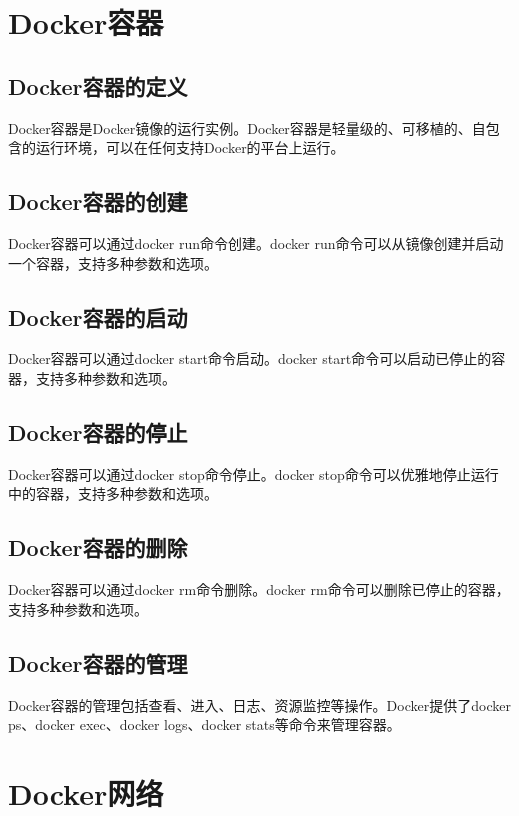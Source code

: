 \documentclass[12pt,UTF8]{ctexbook}
\begin{document}
\chapter{Docker容器}

\section{Docker容器的定义}

Docker容器是Docker镜像的运行实例。Docker容器是轻量级的、可移植的、自包含的运行环境，可以在任何支持Docker的平台上运行。

\section{Docker容器的创建}

Docker容器可以通过docker run命令创建。docker run命令可以从镜像创建并启动一个容器，支持多种参数和选项。

\section{Docker容器的启动}

Docker容器可以通过docker start命令启动。docker start命令可以启动已停止的容器，支持多种参数和选项。

\section{Docker容器的停止}

Docker容器可以通过docker stop命令停止。docker stop命令可以优雅地停止运行中的容器，支持多种参数和选项。

\section{Docker容器的删除}

Docker容器可以通过docker rm命令删除。docker rm命令可以删除已停止的容器，支持多种参数和选项。

\section{Docker容器的管理}

Docker容器的管理包括查看、进入、日志、资源监控等操作。Docker提供了docker ps、docker exec、docker logs、docker stats等命令来管理容器。

\chapter{Docker网络}
\end{document}
